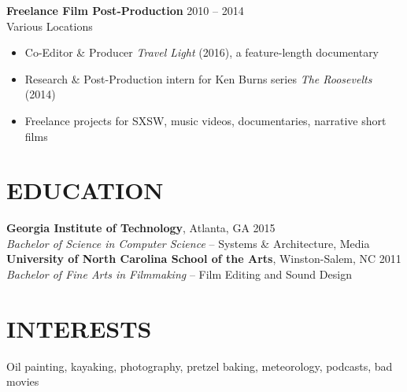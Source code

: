 \documentclass[margin]{res}
\begin{document}
\begin{resume}
                \textbf{Freelance Film Post-Production} \hfill 2010 -- 2014\\
                Various Locations
                \begin{itemize}  \itemsep -2pt %
                  \item Co-Editor \& Producer \textit{Travel Light} (2016), a feature-length documentary
                  \item Research \& Post-Production intern for Ken Burns series \textit{The Roosevelts} (2014)
                  \item Freelance projects for SXSW, music videos, documentaries, narrative short films
                \end{itemize}

\vspace{-5pt}

\section{EDUCATION} \textbf{Georgia Institute of Technology}, Atlanta, GA \hfill 2015\\
                   \textit{Bachelor of Science in Computer Science} -- Systems \& Architecture, Media\vspace{3pt}\\
                   \textbf{University of North Carolina School of the Arts}, Winston-Salem, NC \hfill 2011\\
                   \textit{Bachelor of Fine Arts in Filmmaking} -- Film Editing and Sound Design

\vspace{-5pt}

\section{INTERESTS}  Oil painting, kayaking, photography, pretzel baking, meteorology, podcasts, bad movies\\

\end{resume}
\end{document}
